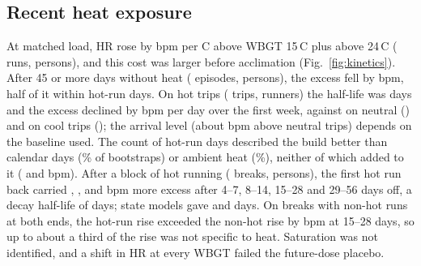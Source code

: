 \documentclass[12pt]{article}
\newcommand{\degC}{\,\textdegree C}
\newcommand{\bpmC}{bpm per \textdegree C}
\begin{document}
\subsection{Recent heat exposure}
At matched load, HR rose by \hrSlope{} \bpmC{} above WBGT 15\degC{} plus \hrSlopeTwentyfour{} above 24\degC{} (\hrRuns{} runs, \hrPersons{} persons), and this cost was larger before acclimation (Fig.~\ref{fig:kinetics}). After 45 or more days without heat (\kinOnsetEpisodes{} episodes, \kinOnsetPersons{} persons), the excess fell by \kinOnsetDecline{} bpm, half of it within \kinOnsetHalf{} hot-run days. On hot trips (\kinTrips{} trips, \kinTripPersons{} runners) the half-life was \kinTripHalf{} days and the excess declined by \kinSlopeHot{} bpm per day over the first week, against \kinSlopeNeutral{} on neutral (\kinTripsNeutral) and \kinSlopeCool{} on cool trips (\kinTripsCool); the arrival level (about \kinArrival{} bpm above neutral trips) depends on the baseline used. The count of hot-run days described the build better than calendar days (\kinCountCal\% of bootstraps) or ambient heat (\kinCountAmb\%), neither of which added to it (\kinCalAdd{} and \kinAmbAdd{} bpm). After a block of hot running (\kinBreaks{} breaks, \kinBreakPersons{} persons), the first hot run back carried \kinBreakFour, \kinBreakEight, \kinBreakFifteen{} and \kinBreakTwentynine{} bpm more excess after 4--7, 8--14, 15--28 and 29--56 days off, a decay half-life of \kinDecayHalf{} days; state models gave \kinStateOnset{} and \kinStatePanel{} days. On \kinNonhotBreaks{} breaks with non-hot runs at both ends, the hot-run rise exceeded the non-hot rise by \kinNonhotDiD{} bpm at 15--28 days, so up to about a third of the rise was not specific to heat. Saturation was not identified, and a shift in HR at every WBGT failed the future-dose placebo.
\end{document}
